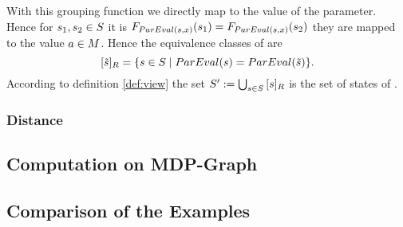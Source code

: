 \documentclass[preview]{standalone}
\begin{document}
With this grouping function we directly map to the value of the parameter. Hence for ${s}_1, {s}_2 \in {S}$ it is ${{{F}}_{{ParEval}({s},{x})}}({s}_1) = {{{F}}_{{ParEval}({s},{x})}}({s}_2)$ \iffN they are mapped to the value ${a} \in {\ensuremath{{M}}}$. Hence the equivalence classes of \eqrelview are
\[
{{[{\tilde{{s}}}]_{{R}}}} = \{ {s} \in {S} \mid {ParEval}({s}) = {ParEval}({\tilde{{s}}})\}.
\]
According to definition \ref{def:view} the set ${S}' := \bigcup_{{s} \in {S}} {{[{s}]_{{R}}}}$ is the set of states of \viewparamvalident.

\subsubsection{Distance}
\subsection{Computation on MDP-Graph}




\subsection{Comparison of the Examples}
\end{document}
